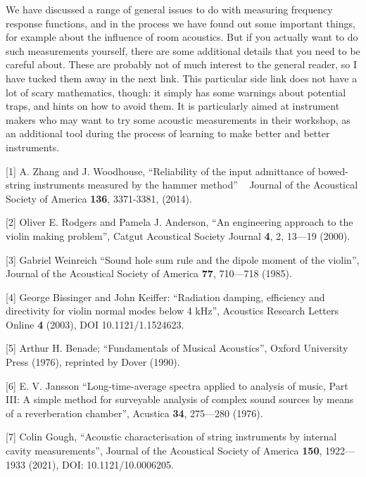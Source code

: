 
  We have discussed a range of general issues to do with measuring frequency 
  response functions, and in the process we have found out some important 
  things, for example about the influence of room acoustics. But if you 
  actually want to do such measurements yourself, there are some additional 
  details that you need to be careful about. These are probably not of much 
  interest to the general reader, so I have tucked them away in the next link. 
  This particular side link does not have a lot of scary mathematics, though: 
  it simply has some warnings about potential traps, and hints on how to avoid 
  them. It is particularly aimed at instrument makers who may want to try some 
  acoustic measurements in their workshop, as an additional tool during the 
  process of learning to make better and better instruments. 



  \sectionreferences{}[1] A. Zhang and J. Woodhouse, “Reliability of the input 
  admittance of bowed-string instruments measured by the hammer method” ~ 
  Journal of the Acoustical Society of America \textbf{136}, 3371-3381, (2014). 

  [2] Oliver E. Rodgers and Pamela J. Anderson, “An engineering approach to the 
  violin making problem”, Catgut Acoustical Society Journal \textbf{4}, 2, 
  13—19 (2000). 

  [3] Gabriel Weinreich “Sound hole sum rule and the dipole moment of the 
  violin”, Journal of the Acoustical Society of America \textbf{77}, 710—718 
  (1985). 

  [4] George Bissinger and John Keiffer: “Radiation damping, efficiency and 
  directivity for violin normal modes below 4 kHz”, Acoustics Research Letters 
  Online \textbf{4} (2003), DOI 10.1121/1.1524623. 

  [5] Arthur H. Benade; “Fundamentals of Musical Acoustics”, Oxford University 
  Press (1976), reprinted by Dover (1990). 

  [6] E. V. Jansson “Long-time-average spectra applied to analysis of music, 
  Part III: A simple method for surveyable analysis of complex sound sources by 
  means of a reverberation chamber”, Acustica \textbf{34}, 275—280 (1976). 

  [7] Colin Gough, “Acoustic characterisation of string instruments by internal 
  cavity measurements”, Journal of the Acoustical Society of America 
  \textbf{150}, 1922—1933 (2021), DOI: 10.1121/10.0006205. 
